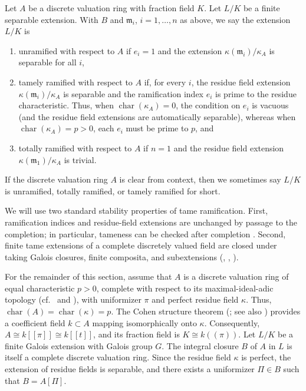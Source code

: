 \begin{definition}[\stackstag{09E9}]\label{definition:tamely_ramified_dvrs}
Let $A$ be a discrete valuation ring with fraction field $K$. Let $L/K$ be a finite separable extension. With $B$ and $\mathfrak m_ i$, $i = 1, \ldots , n$
as above, we say the extension $L/K$ is
\begin{enumerate}
    \item unramified with respect to $A$ if $e_ i = 1$ and the extension $\kappa (\mathfrak m_ i)/\kappa _ A$ is separable for all $i$,
    \item tamely ramified with respect to $A$ if, for every $i$, the residue field extension
    $\kappa(\mathfrak m_i)/\kappa_A$ is separable and the ramification index $e_i$ is prime to
    the residue characteristic. Thus, when $\operatorname{char}(\kappa_A)=0$, the condition on
    $e_i$ is vacuous (and the residue field extensions are automatically separable), whereas when
    $\operatorname{char}(\kappa_A)=p>0$, each $e_i$ must be prime to $p$, and
    \item totally ramified with respect to $A$ if $n = 1$ and the residue field extension $\kappa (\mathfrak m_1)/\kappa _ A$ is trivial.
\end{enumerate}
If the discrete valuation ring $A$ is clear from context, then we sometimes say $L/K$ is unramified, totally ramified, or tamely ramified for short.
\end{definition}

We will use two standard stability properties of tame ramification. First,
ramification indices and residue-field extensions are unchanged by passage to
the completion; in particular, tameness can be checked after completion
\cite[Chapter~II, \S3, Theorem~1]{serreLF}. Second, finite tame extensions of a complete
discretely valued field are closed under taking Galois closures, finite
composita, and subextensions (, ,
).

For the remainder of this section, assume that $A$ is a discrete valuation ring of equal characteristic
$p>0$, complete with respect to its maximal-ideal-adic topology (cf.\  and
), with uniformizer $\pi$ and perfect residue field $\kappa$. Thus,
$\operatorname{char}(A)=\operatorname{char}(\kappa)=p$. The Cohen structure theorem
(; see also ) provides a coefficient field $k\subset A$ mapping
isomorphically onto $\kappa$. Consequently, $A\cong k[[\pi]]\cong k[[t]]$, and its fraction field is
$K\cong k((\pi))$.
Let $L/K$ be a finite Galois extension with Galois group $G$.
The integral closure $B$ of $A$ in $L$ is itself a complete discrete valuation ring.
Since the residue field $\kappa$ is perfect, the extension of residue fields is separable, and there exists a uniformizer
$\Pi \in B$ such that $B = A[\Pi]$.

